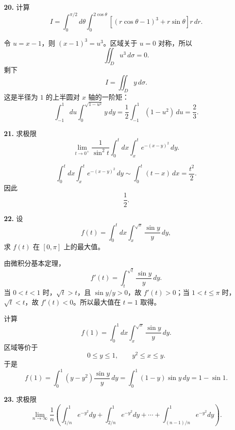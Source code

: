 \begin{problemblock}
\textbf{20.} 计算
\[
I=\int_0^{\pi/2}d\theta\int_0^{2\cos\theta}
\left[(r\cos\theta-1)^3+r\sin\theta\right]r\,dr.
\]
\end{problemblock}

\begin{solutionblock}
令 \(u=x-1\)，则 \((x-1)^3=u^3\)。区域关于 \(u=0\) 对称，所以
\[
\iint_Du^3\,d\sigma=0.
\]
剩下
\[
I=\iint_D y\,d\sigma.
\]
这是半径为 \(1\) 的上半圆对 \(x\) 轴的一阶矩：
\[
\int_{-1}^1du\int_0^{\sqrt{1-u^2}}y\,dy
=\frac12\int_{-1}^1(1-u^2)\,du
=\boxed{\frac23}.
\]
\end{solutionblock}

\begin{problemblock}
\textbf{21.} 求极限
\[
\lim_{t\to0^+}\frac1{\sin^2t}\int_0^t dx\int_x^t e^{-(x-y)^2}\,dy.
\]
\end{problemblock}

\begin{solutionblock}
\[
\int_0^t dx\int_x^t e^{-(x-y)^2}\,dy
\sim \int_0^t(t-x)\,dx=\frac{t^2}{2}.
\]
因此
\[
\boxed{\frac12}.
\]
\end{solutionblock}

\begin{problemblock}
\textbf{22.} 设
\[
f(t)=\int_0^t dx\int_x^{\sqrt{x}}\frac{\sin y}{y}\,dy,
\]
求 \(f(t)\) 在 \([0,\pi]\) 上的最大值。
\end{problemblock}

\begin{solutionblock}
由微积分基本定理，
\[
f'(t)=\int_t^{\sqrt t}\frac{\sin y}{y}\,dy.
\]
当 \(0<t<1\) 时，\(\sqrt t>t\)，且 \(\sin y/y>0\)，故 \(f'(t)>0\)；当 \(1<t\le\pi\) 时，\(\sqrt t<t\)，故 \(f'(t)<0\)。所以最大值在 \(t=1\) 取得。

计算
\[
f(1)=\int_0^1dx\int_x^{\sqrt x}\frac{\sin y}{y}\,dy.
\]
区域等价于
\[
0\le y\le1,\qquad y^2\le x\le y.
\]
于是
\[
f(1)=\int_0^1(y-y^2)\frac{\sin y}{y}\,dy
=\int_0^1(1-y)\sin y\,dy
=\boxed{1-\sin1}.
\]
\end{solutionblock}

\begin{problemblock}
\textbf{23.} 求极限
\[
\lim_{n\to\infty}\frac1n\left(\int_{1/n}^1e^{-y^2}dy+\int_{2/n}^1e^{-y^2}dy+\cdots+\int_{(n-1)/n}^1e^{-y^2}dy\right).
\]
\end{problemblock}

